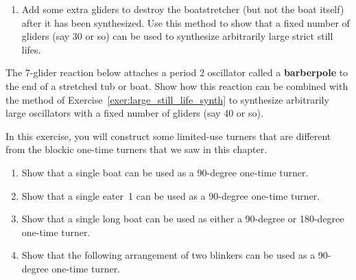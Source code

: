\begin{multicols}{2}
\begin{problemstar}
\begin{enumerate}[label=\bf\color{ocre}(\alph*)]
			\item {} Add some extra gliders to destroy the boatstretcher (but not the boat itself) after it has been synthesized. Use this method to show that a fixed number of gliders (say 30 or so) can be used to synthesize arbitrarily large strict still lifes.
		\end{enumerate}
	\end{problemstar}
	
	
	\mfilbreak
	
	
	\begin{problem}\label{exer:large_oscillator_synth} 
		The 7-glider reaction below attaches a period $2$ oscillator called a \textbf{barberpole} to the end of a stretched tub or boat. Show how this reaction can be combined with the method of Exercise~\ref{exer:large_still_life_synth} to synthesize arbitrarily large oscillators with a fixed number of gliders (say 40 or so).
		
		\begin{center}
		\end{center}
	\end{problem}
	
	
	\mfilbreak
	
	
	\begin{problemstar}\label{exer:boat_one_time_turner} 
		In this exercise, you will construct some limited-use turners that are different from the blockic one-time turners that we saw in this chapter.\smallskip
		
		\begin{enumerate}[label=\bf\color{ocre}(\alph*)]
			\item Show that a single boat can be used as a 90-degree one-time turner.
			
			\item Show that a single eater~1 can be used as a 90-degree one-time turner.
			
			\item Show that a single long boat can be used as either a 90-degree or 180-degree one-time turner.
			
			\item Show that the following arrangement of two blinkers can be used as a 90-degree one-time turner.
			\begin{center}
			\end{center}
		\end{enumerate}
	\end{problemstar}
	

\end{multicols}
